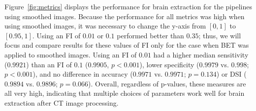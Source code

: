\documentclass{elsarticle}\usepackage[]{graphicx}\usepackage[]{color}
\begin{document}
Figure~\ref{fig:metrics}\protect{} displays the performance for brain extraction for the pipelines using smoothed images.   Because the performance for all metrics was high when using smoothed images, it was necessary to change the y-axis from $[0,1]$ to $[0.95,1]$. 
Using an FI of $0.01$ or $0.1$ performed better than $0.35$; thus, we will focus and compare results for these values of FI only for the case when BET was applied to smoothed images.  Using an FI of $0.01$ had a higher median sensitivity ($0.9921$) than an FI of $0.1$ ($0.9905$, $p< 0.001$), lower specificity ($0.9979$ vs. $0.998$; $p< 0.001$), and no difference in accuracy ($0.9971$ vs. $0.9971$; $p= 0.134$) or DSI ($0.9894$ vs. $0.9896$; $p= 0.066$).  Overall, regardless of p-values, these measures are all very high, indicating that multiple choices of parameters work well for brain extraction after CT image processing.

% 
% 
\end{document}
